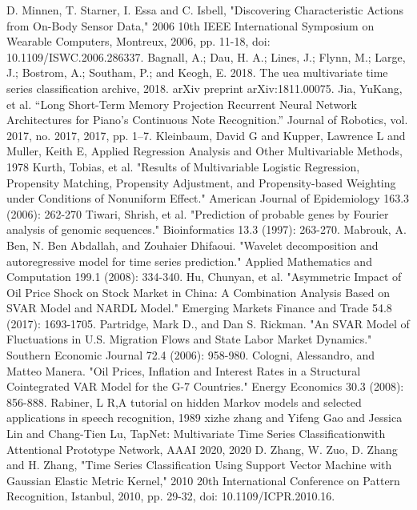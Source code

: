 \documentclass[12pt]{ctexart}
\begin{document}
\newpage
{}
\setcounter{page}{1}
\begin{thebibliography}{99}

D. Minnen, T. Starner, I. Essa and C. Isbell, "Discovering Characteristic Actions from On-Body Sensor Data," 2006 10th IEEE International Symposium on Wearable Computers, Montreux, 2006, pp. 11-18, doi: 10.1109/ISWC.2006.286337.
Bagnall, A.; Dau, H. A.; Lines, J.; Flynn, M.; Large, J.; Bostrom, A.; Southam, P.; and Keogh, E. 2018. The uea multivariate time series classification archive, 2018. arXiv preprint arXiv:1811.00075.
Jia, YuKang, et al. “Long Short-Term Memory Projection Recurrent Neural Network Architectures for Piano’s Continuous Note Recognition.” Journal of Robotics, vol. 2017, no. 2017, 2017, pp. 1–7.
Kleinbaum, David G and Kupper, Lawrence L and Muller, Keith E, Applied Regression Analysis and Other Multivariable Methods, 1978
Kurth, Tobias, et al. "Results of Multivariable Logistic Regression, Propensity Matching, Propensity Adjustment, and Propensity-based Weighting under Conditions of Nonuniform Effect." American Journal of Epidemiology 163.3 (2006): 262-270
Tiwari, Shrish, et al. "Prediction of probable genes by Fourier analysis of genomic sequences." Bioinformatics 13.3 (1997): 263-270.
Mabrouk, A. Ben, N. Ben Abdallah, and Zouhaier Dhifaoui. "Wavelet decomposition and autoregressive model for time series prediction." Applied Mathematics and Computation 199.1 (2008): 334-340.
Hu, Chunyan, et al. "Asymmetric Impact of Oil Price Shock on Stock Market in China: A Combination Analysis Based on SVAR Model and NARDL Model." Emerging Markets Finance and Trade 54.8 (2017): 1693-1705.
Partridge, Mark D., and Dan S. Rickman. "An SVAR Model of Fluctuations in U.S. Migration Flows and State Labor Market Dynamics." Southern Economic Journal 72.4 (2006): 958-980.
Cologni, Alessandro, and Matteo Manera. "Oil Prices, Inflation and Interest Rates in a Structural Cointegrated VAR Model for the G-7 Countries." Energy Economics 30.3 (2008): 856-888.
Rabiner, L R,A tutorial on hidden Markov models and selected applications in speech recognition, 1989
xizhe zhang and Yifeng Gao and Jessica Lin and Chang-Tien Lu, TapNet: Multivariate Time Series Classificationwith Attentional Prototype Network, AAAI 2020, 2020
D. Zhang, W. Zuo, D. Zhang and H. Zhang, "Time Series Classification Using Support Vector Machine with Gaussian Elastic Metric Kernel," 2010 20th International Conference on Pattern Recognition, Istanbul, 2010, pp. 29-32, doi: 10.1109/ICPR.2010.16.

\end{thebibliography}
\end{document}
